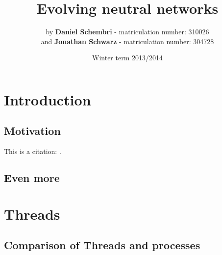 \documentclass[10pt,a4paper,DIV=11]{scrreprt}
\title
{
    Evolving neutral networks\\
}
\author
{
    by \textbf{Daniel Schembri} - matriculation number: 310026 \\
    and \textbf{Jonathan Schwarz} - matriculation number: 304728
}
\date
{
    Winter term 2013/2014
}
\begin{document}

\maketitle
\thispagestyle{empty}
\newpage
{\large\tableofcontents}
\newpage
\chapter{Introduction}
\section{Motivation}
This is a citation: \cite{EMB}. 

\section{Even more}

\chapter{Threads}
\section{Comparison of Threads and processes}
\end{document}
